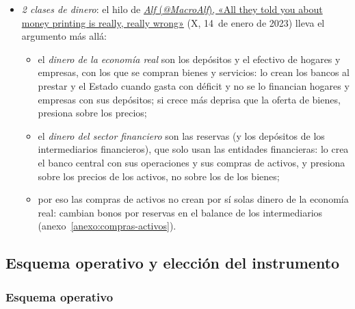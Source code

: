 \documentclass[11pt]{article}
\begin{document}
\begin{anotaciones}
\begin{itemize}
\begin{enumerate}
  \end{enumerate}
\item \emph{2 clases de dinero}: el hilo de \href{https://x.com/MacroAlf/status/1614315558463209473}{\emph{Alf} (\emph{@MacroAlf}), «All they told you about money printing is really, really wrong»} (X, 14~de enero de 2023) lleva el argumento más allá:
  \begin{itemize}
  \item el \emph{dinero de la economía real} son los depósitos y el efectivo de hogares y empresas, con los que se compran bienes y servicios: lo crean los bancos al prestar y el Estado cuando gasta con déficit y no se lo financian hogares y empresas con sus depósitos; si crece más deprisa que la oferta de bienes, presiona sobre los precios;
  \item el \emph{dinero del sector financiero} son las reservas (y los depósitos de los intermediarios financieros), que solo usan las entidades financieras: lo crea el banco central con sus operaciones y sus compras de activos, y presiona sobre los precios de los activos, no sobre los de los bienes;
  \item por eso las compras de activos no crean por sí solas dinero de la economía real: cambian bonos por reservas en el balance de los intermediarios (anexo~\ref{anexo:compras-activos}).
  \end{itemize}
\end{itemize}
\begin{infografiacaja}
\caption{La creación de dinero al conceder un préstamo: los balances antes y después}\label{figu:creacion-dinero}
\end{infografiacaja}
\end{anotaciones}

\subsection{Esquema operativo y elección del instrumento}\label{sec:esquema-instrumento}

\subsubsection{Esquema operativo}\label{sec:esquema-operativo}
\end{document}
